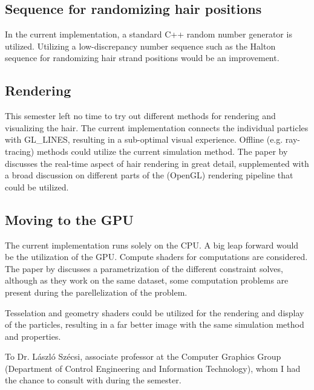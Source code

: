 \documentclass[sigplan,screen,nonacm]{acmart}
\begin{document}
\subsection{Sequence for randomizing hair positions}
In the current implementation, a standard C++ random number generator is
utilized. Utilizing a low-discrepancy number sequence such as the Halton
sequence for randomizing hair strand positions would be an improvement.

\subsection{Rendering}
This semester left no time to try out different methods for rendering and
visualizing the hair. The current implementation connects the individual
particles with GL\_LINES, resulting in a sub-optimal visual experience. Offline
(e.g. ray-tracing) methods could utilize the current simulation method. 
The paper by \citet{RappRealTime} discusses the real-time aspect of hair
rendering in great detail, supplemented with a broad discussion on different
parts of the (OpenGL) rendering pipeline that could be utilized.

\subsection{Moving to the GPU}
The current implementation runs solely on the CPU. A big leap forward would be
the utilization of the GPU. Compute shaders for computations are considered. The
paper by \citet{UmenhofferSimulation} discusses a parametrization of the
different constraint solves, although as they work on the same dataset, some
computation problems are present during the parellelization of the
problem.

Tesselation and geometry shaders could be utilized for the rendering and display
of the particles, resulting in a far better image with the same simulation
method and properties.

\begin{acks}
    To Dr. László Szécsi, associate professor at the Computer Graphics Group
    (Department of Control Engineering and Information Technology), whom I had
    the chance to consult with during the semester.
\end{acks}
\end{document}
